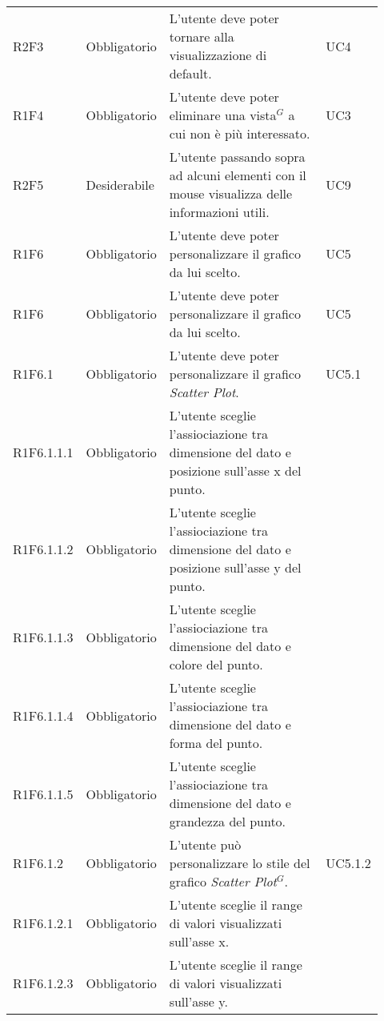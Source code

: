 {\begin{longtable}{p{0.12\linewidth}p{0.15\linewidth}p{0.50\linewidth}p{0.15\linewidth}}
    \rowcolor[RGB]{216, 235, 171}
    R2F3 & Obbligatorio & L'utente deve poter tornare alla visualizzazione di default. & UC4\\

    \rowcolor[RGB]{216, 235, 171}
    R1F4 & Obbligatorio & L'utente deve poter eliminare una vista$^{G}$ a cui non è più interessato. & UC3\\

    \rowcolor[RGB]{233, 245, 206}
    R2F5 & Desiderabile & L'utente passando sopra ad alcuni elementi con il mouse visualizza delle informazioni utili. & UC9\\

    \rowcolor[RGB]{216, 235, 171}
    R1F6 & Obbligatorio & L'utente deve poter personalizzare il grafico da lui scelto. & UC5\\
    \rowcolor[RGB]{233, 245, 206}
    R1F6 & Obbligatorio & L'utente deve poter personalizzare il grafico da lui scelto. & UC5\\
    \rowcolor[RGB]{216, 235, 171}
    R1F6.1 & Obbligatorio & L'utente deve poter personalizzare il grafico \textit{Scatter Plot}. & UC5.1\\
    \rowcolor[RGB]{233, 245, 206}
    R1F6.1.1.1 & Obbligatorio & L'utente sceglie l'assiociazione tra dimensione del dato e posizione sull'asse x del punto.&\\
    \rowcolor[RGB]{216, 235, 171}
    R1F6.1.1.2 & Obbligatorio & L'utente sceglie l'assiociazione tra dimensione del dato e posizione sull'asse y del punto.&\\
    \rowcolor[RGB]{233, 245, 206}
    R1F6.1.1.3 & Obbligatorio & L'utente sceglie l'assiociazione tra dimensione del dato e colore del punto.&\\
    \rowcolor[RGB]{216, 235, 171}
    R1F6.1.1.4 & Obbligatorio & L'utente sceglie l'assiociazione tra dimensione del dato e forma del punto.&\\
    \rowcolor[RGB]{233, 245, 206}
    R1F6.1.1.5 & Obbligatorio & L'utente sceglie l'assiociazione tra dimensione del dato e grandezza del punto.&\\
    \rowcolor[RGB]{216, 235, 171}
    R1F6.1.2 & Obbligatorio & L'utente può personalizzare lo stile del grafico \textit{Scatter Plot$^{G}$}. & UC5.1.2\\
    \rowcolor[RGB]{233, 245, 206}
    R1F6.1.2.1 & Obbligatorio & L'utente sceglie il range di valori visualizzati sull'asse x. & \\
    \rowcolor[RGB]{216, 235, 171}
    R1F6.1.2.3 & Obbligatorio & L'utente sceglie il range di valori visualizzati sull'asse y. & \\

\end{longtable}}
